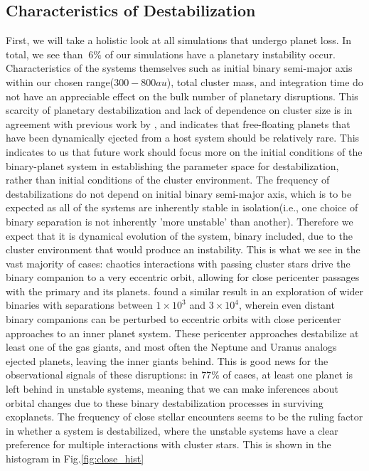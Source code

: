 \documentclass{aastex631}
\begin{document}
\subsection{Characteristics of Destabilization}
First, we will take a holistic look at all simulations that undergo planet loss. In total, we see than $~ 6\%$ of our simulations
have a planetary instability occur. Characteristics of the systems themselves such 
as initial binary semi-major axis within our chosen range($300-800au$), total cluster mass, and integration time do not have an appreciable effect on the bulk number of 
planetary disruptions. This scarcity of planetary destabilization and lack of dependence
on cluster size is in agreement with previous work by \cite{dlfm99}, and indicates that free-floating
planets that have been dynamically ejected from a host system should be relatively rare. This indicates to us that future work
should focus more on the initial conditions of the binary-planet system in establishing the parameter space for destabilization, rather
than initial conditions of the cluster environment.
The frequency of destabilizations do not depend on initial binary semi-major axis, which 
is to be expected as all of the systems are inherently stable in 
isolation(i.e., one choice of binary separation is not inherently 'more unstable' than another). 
Therefore we expect that it is dynamical evolution of the system, binary included, due to the cluster environment that 
would produce an instability. This is what we see in the vast majority of cases: chaotics interactions with passing cluster stars 
drive the binary companion to a very eccentric orbit, allowing for close pericenter passages with the primary and its planets. \cite{kaib13}
found a similar result in an exploration of wider binaries with separations between $1\times 10^3$ and $3\times 10^4$, wherein even distant binary companions
can be perturbed to eccentric orbits with close pericenter approaches to an inner planet system. 
These pericenter approaches destabilize at least one of the gas giants, and most often the Neptune and Uranus analogs ejected planets,
 leaving the inner giants behind. This is good news for the observational signals of these disruptions: in $77\%$ of cases, 
at least one planet is left behind in unstable systems, meaning that we can make inferences about orbital changes due to these binary destabilization processes 
in surviving exoplanets. The frequency of close stellar encounters seems to be the ruling factor in whether a system is destabilized,
where the unstable systems have a clear preference for multiple interactions with cluster stars. This is shown in the histogram in Fig.\ref{fig:close_hist}
\end{document}
